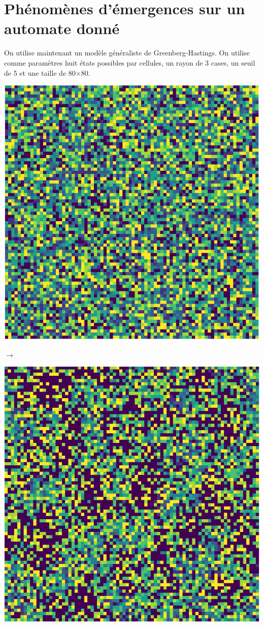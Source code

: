 \documentclass[12pt, a4paper]{article}
\begin{document}
    \section{Phénomènes d'émergences sur un automate donné}
        On utilise maintenant un modèle généraliste de Greenberg-Hastings. On utilise comme paramètres huit états possibles par cellules, un rayon de 3 cases, un seuil de 5 et une taille de 80$\times$80.
        \begin{center}
            \begin{minipage}{.17\linewidth}
                \includegraphics[scale=0.15]{img/part2/step1.png}
            \end{minipage}
            $\rightarrow$
            \begin{minipage}{.17\linewidth}
                \includegraphics[scale=0.15]{img/part2/step2.png}

\end{minipage}
\end{center}
\end{document}

